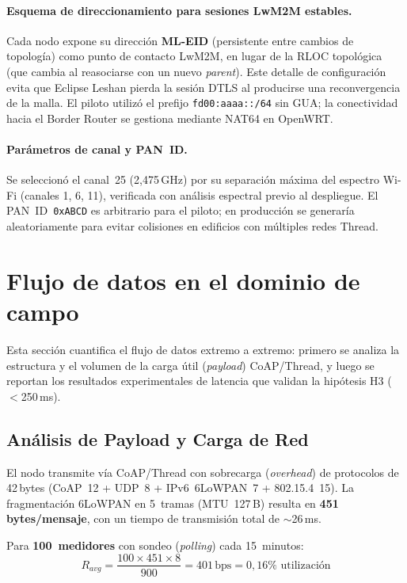 \paragraph{Esquema de direccionamiento para sesiones LwM2M estables.}
Cada nodo expone su dirección \textbf{ML-EID} (persistente entre cambios de topología) como punto de contacto LwM2M, en lugar de la RLOC topológica (que cambia al reasociarse con un nuevo \emph{parent}). Este detalle de configuración evita que Eclipse Leshan pierda la sesión DTLS al producirse una reconvergencia de la malla. El piloto utilizó el prefijo \texttt{fd00:aaaa::/64} sin GUA; la conectividad hacia el Border Router se gestiona mediante NAT64 en OpenWRT.

\paragraph{Parámetros de canal y PAN~ID.}
Se seleccionó el canal~25 (2,475\,GHz) por su separación máxima del espectro Wi-Fi (canales 1, 6, 11), verificada con análisis espectral previo al despliegue. El PAN~ID~\texttt{0xABCD} es arbitrario para el piloto; en producción se generaría aleatoriamente para evitar colisiones en edificios con múltiples redes Thread.


\section{Flujo de datos en el dominio de campo}
\label{sec:nodo-pruebas}

Esta sección cuantifica el flujo de datos extremo a extremo: primero se analiza la estructura y el volumen de la carga útil (\emph{payload}) CoAP/Thread, y luego se reportan los resultados experimentales de latencia que validan la hipótesis H3 ($<$250\,ms).

\subsection{Análisis de Payload y Carga de Red}
\label{sec:nodo-payload-analysis}

El nodo transmite vía CoAP/Thread con sobrecarga (\emph{overhead}) de protocolos de 42\,bytes (CoAP~12 + UDP~8 + IPv6~6LoWPAN~7 + 802.15.4~15). La fragmentación 6LoWPAN en 5~tramas (MTU~127\,B) resulta en \textbf{451\,bytes/mensaje}, con un tiempo de transmisión total de $\sim$26\,ms.

Para \textbf{100~medidores} con sondeo (\emph{polling}) cada 15~minutos:
\begin{equation}
R_{avg} = \frac{100 \times 451 \times 8}{900} = 401\,\text{bps} = 0{,}16\%\text{ utilización}
\end{equation}

